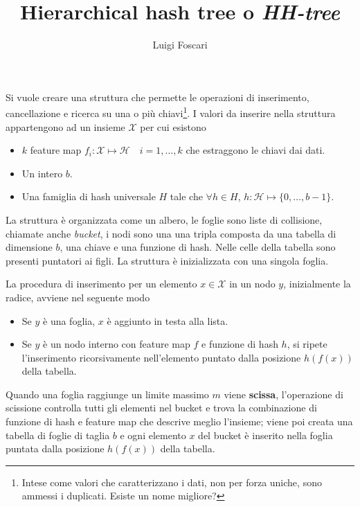 \documentclass[a4paper]{article}
\title{Hierarchical hash tree o \textit{HH-tree}}
\author{Luigi Foscari}
\date{}
\begin{document}
\maketitle

Si vuole creare una struttura che permette le operazioni di inserimento, cancellazione e ricerca su una o più chiavi\footnote{Intese come valori che caratterizzano i dati, non per forza uniche, sono ammessi i duplicati. Esiste un nome migliore?}. I valori da inserire nella struttura appartengono ad un insieme $\mathcal{X}$ per cui esistono
\begin{itemize}
	\item $k$ feature map $f_i: \mathcal{X} \mapsto \mathcal{H} \quad i=1,\ldots,k$ che estraggono le chiavi dai dati.
	\item Un intero $b$.
	\item Una famiglia di hash universale $H$ tale che $\forall h \in H$, $h: \mathcal{H} \mapsto \{ 0, \ldots, b - 1 \}$.
\end{itemize}

La struttura è organizzata come un albero, le foglie sono liste di collisione, chiamate anche \textit{bucket}, i nodi sono una una tripla composta da una tabella di dimensione $b$, una chiave e una funzione di hash. Nelle celle della tabella sono presenti puntatori ai figli. La struttura è inizializzata con una singola foglia.

La procedura di inserimento per un elemento $x \in \mathcal{X}$ in un nodo $y$, inizialmente la radice, avviene nel seguente modo
\begin{itemize}
	\item Se $y$ è una foglia, $x$ è aggiunto in testa alla lista.
	\item Se $y$ è un nodo interno con feature map $f$ e funzione di hash $h$, si ripete l'inserimento ricorsivamente nell'elemento puntato dalla posizione $h(f(x))$ della tabella.
\end{itemize}

Quando una foglia raggiunge un limite massimo $m$ viene \textbf{scissa}, l'operazione di scissione controlla tutti gli elementi nel bucket e trova la combinazione di funzione di hash e feature map che descrive meglio l'insieme; viene poi creata una tabella di foglie di taglia $b$ e ogni elemento $x$ del bucket è inserito nella foglia puntata dalla posizione $h(f(x))$ della tabella.

\end{document}
